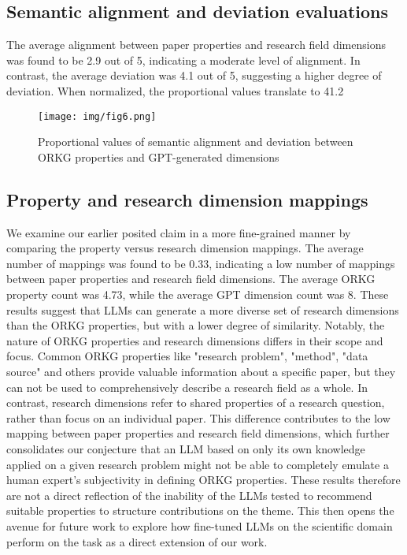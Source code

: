 \subsection{Semantic alignment and deviation evaluations}

The average alignment between paper properties and research field dimensions was found to be 2.9 out of 5, indicating a moderate level of alignment. In contrast, the average deviation was 4.1 out of 5, suggesting a higher degree of deviation. When normalized, the proportional values translate to 41.2\
\begin{figure}[!htb]
\texttt{[image: img/fig6.png]}
\caption{Proportional values of semantic alignment and deviation between ORKG properties and GPT-generated dimensions\label{figure Alignment Deviation}}
\end{figure} 

\subsection{Property and research dimension mappings}

We examine our earlier posited claim in a more fine-grained manner by comparing the property versus research dimension mappings. The average number of mappings was found to be 0.33, indicating a low number of mappings between paper properties and research field dimensions. The average ORKG property count was 4.73, while the average GPT dimension count was 8. These results suggest that LLMs can generate a more diverse set of research dimensions than the ORKG properties, but with a lower degree of similarity. Notably, the nature of ORKG properties and research dimensions differs in their scope and focus. Common ORKG properties like "research problem", "method", "data source" and others provide valuable information about a specific paper, but they can not be used to comprehensively describe a research field as a whole. In contrast, research dimensions refer to shared properties of a research question, rather than focus on an individual paper. This difference contributes to the low mapping between paper properties and research field dimensions, which further consolidates our conjecture that an LLM based on only its own knowledge applied on a given research problem might not be able to completely emulate a human expert's subjectivity in defining ORKG properties. These results therefore are not a direct reflection of the inability of the LLMs tested to recommend suitable properties to structure contributions on the theme. This then opens the avenue for future work to explore how fine-tuned LLMs on the scientific domain perform on the task as a direct extension of our work.

